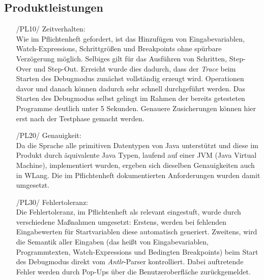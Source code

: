 \documentclass[parskip=full]{scrartcl}
\begin{document}
		\subsection{Produktleistungen}
		\begin{itemize}
		\item[/PL10/] Zeitverhalten: \\ Wie im Pflichtenheft gefordert, ist das Hinzufügen von Eingabevariablen, Watch-Expressions, Schrittgrößen und Breakpoints ohne spürbare Verzögerung möglich. Selbiges gilt für das Ausführen von Schritten, Step-Over und Step-Out. Erreicht wurde dies dadurch, dass der \textit{Trace} beim Starten des Debugmodus zunächst vollständig erzeugt wird. Operationen davor und danach können dadurch sehr schnell durchgeführt werden. Das Starten des Debugmodus selbst gelingt im Rahmen der bereits getesteten Programme deutlich unter 5 Sekunden. Genauere Zusicherungen können hier erst nach der Testphase gemacht werden.

		\item[/PL20/] Genauigkeit: \\
		Da die Sprache alle primitiven Datentypen von Java unterstützt und diese im Produkt durch äquivalente Java Typen, laufend auf einer JVM (Java Virtual Machine), implementiert wurden, ergeben sich dieselben Genauigkeiten auch in WLang. Die im Pflichtenheft dokumentierten Anforderungen wurden damit umgesetzt.

		\item[/PL30/] Fehlertoleranz: \\
		Die Fehlertoleranz, im Pflichtenheft als relevant eingestuft, wurde durch verschiedene Maßnahmen umgesetzt: Erstens, werden bei fehlenden Eingabewerten für Startvariablen diese automatisch generiert. Zweitens, wird die Semantik aller Eingaben (das heißt von Eingabevariablen, Programmtexten, Watch-Expressions und Bedingten Breakpoints) beim Start des Debugmodus direkt vom \textit{Antlr}-Parser kontrolliert. Dabei auftretende Fehler werden durch Pop-Ups über die Benutzeroberfläche zurückgemeldet.
		\end{itemize}
		
\end{document}
